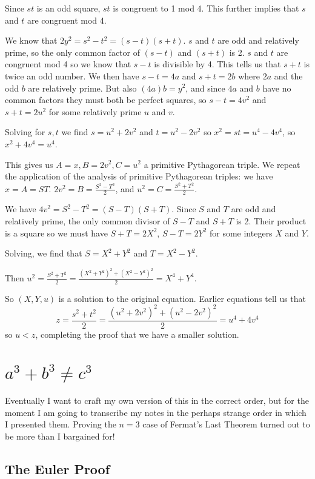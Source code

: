 \documentclass[12pt]{article}
\begin{document}
Since $st$ is an odd square, $st$ is congruent to 1 mod 4.  This further implies that $s$ and $t$ are congruent mod 4.

We know that $2y^2=s^2-t^2=(s-t)(s+t)$.  $s$ and $t$ are odd and relatively prime, so the only common factor of $(s-t)$ and $(s+t)$
is 2.  $s$ and $t$ are congruent mod 4 so we know that $s-t$ is divisible by 4.  This tells us that $s+t$ is twice an odd number.  We then
have $s-t=4a$ and $s+t=2b$ where $2a$ and the odd $b$ are relatively prime.  But also $(4a)b=y^2$, and since $4a$ and $b$ have no common factors they must both be perfect squares, so $s-t=4v^2$ and $s+t=2u^2$ for some relatively prime $u$ and $v$.

Solving for $s,t$ we find $s=u^2+2v^2$ and $t=u^2-2v^2$ so $x^2=st=u^4-4v^4$, so $x^2+4v^4=u^4$.

This gives us $A=x, B=2v^2, C=u^2$ a primitive Pythagorean triple.  We repeat the application of the analysis of primitive Pythagorean triples:
we have $x=A=ST$. $2v^2=B=\frac{S^2-T^2}2$, and $u^2=C=\frac{S^2+T^2}2$.

We have $4v^2=S^2-T^2=(S-T)(S+T)$.   Since $S$ and $T$ are odd and relatively prime, the only common divisor of $S-T$ and $S+T$ is 2.
Their product is a square so we must have $S+T=2X^2$, $S-T=2Y^2$ for some integers $X$ and $Y$.

Solving, we find that $S=X^2+Y^2$ and $T=X^2-Y^2$.

Then $u^2 = \frac{S^2+T^2}2 = \frac{(X^2+Y^2)^2+(X^2-Y^2)^2}2=X^4+Y^4$.

So $(X,Y,u)$ is a solution to the original equation.  Earlier equations tell us that $$z=\frac{s^2+t^2}2=\frac{(u^2+2v^2)^2+(u^2-2v^2)^2}2=u^4+4v^4$$ so $u<z$, completing the proof that we have a smaller solution.



\newpage

\section{$a^3 + b^3 \neq c^3$}

Eventually I want to craft my own version of this in the correct order, but for the moment I am going to transcribe my notes in the perhaps strange order in which I presented them.   Proving the $n=3$ case of Fermat's Last Theorem turned out to be more than I bargained for!

\subsection{The Euler Proof}
\end{document}
